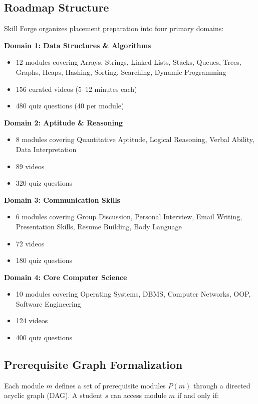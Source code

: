 \documentclass[journal]{IEEEtran}
\begin{document}
\subsection{Roadmap Structure}

Skill Forge organizes placement preparation into four primary domains:

\textbf{Domain 1: Data Structures \& Algorithms}
\begin{itemize}
    \item 12 modules covering Arrays, Strings, Linked Lists, Stacks, Queues, Trees, Graphs, Heaps, Hashing, Sorting, Searching, Dynamic Programming
    \item 156 curated videos (5--12 minutes each)
    \item 480 quiz questions (40 per module)
\end{itemize}

\textbf{Domain 2: Aptitude \& Reasoning}
\begin{itemize}
    \item 8 modules covering Quantitative Aptitude, Logical Reasoning, Verbal Ability, Data Interpretation
    \item 89 videos
    \item 320 quiz questions
\end{itemize}

\textbf{Domain 3: Communication Skills}
\begin{itemize}
    \item 6 modules covering Group Discussion, Personal Interview, Email Writing, Presentation Skills, Resume Building, Body Language
    \item 72 videos
    \item 180 quiz questions
\end{itemize}

\textbf{Domain 4: Core Computer Science}
\begin{itemize}
    \item 10 modules covering Operating Systems, DBMS, Computer Networks, OOP, Software Engineering
    \item 124 videos
    \item 400 quiz questions
\end{itemize}

\subsection{Prerequisite Graph Formalization}

Each module $m$ defines a set of prerequisite modules $P(m)$ through a directed acyclic graph (DAG). A student $s$ can access module $m$ if and only if:
\end{document}
